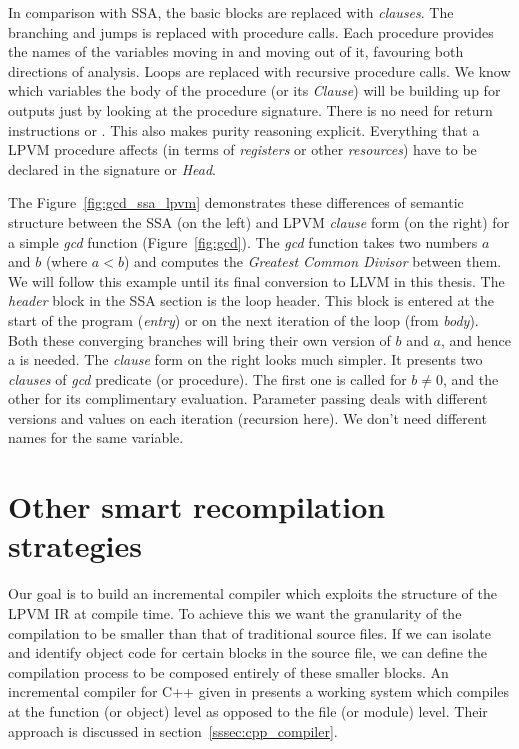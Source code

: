 In comparison with SSA, the basic blocks are replaced with \textit{clauses}.
The branching and jumps is replaced with procedure calls. Each procedure
provides the names of the variables moving in and moving out of it, favouring
both directions of analysis. Loops are replaced with recursive procedure
calls. We know which variables the body of the procedure (or its
\textit{Clause}) will be building up for outputs just by looking at the
procedure signature. There is no need for return instructions or \phifs. This
also makes purity reasoning explicit. Everything that a LPVM procedure affects
(in terms of \textit{registers} or other \textit{resources}) have to be
declared in the signature or \textit{Head}.

The Figure~\ref{fig:gcd_ssa_lpvm} demonstrates these differences of semantic
structure between the SSA (on the left) and LPVM \textit{clause} form (on the
right) for a simple \textit{gcd} function (Figure~\ref{fig:gcd}). The
\textit{gcd} function takes two numbers $a$ and $b$ (where $a < b$) and
computes the \textit{Greatest Common Divisor} between them. We will follow this
example until its final conversion to LLVM in this thesis. The \textit{header}
block in the SSA section is the loop header. This block is entered at the start
of the program (\textit{entry}) or on the next iteration of the loop (from
\textit{body}). Both these converging branches will bring their own version of
$b$ and $a$, and hence a \phif is needed. The \textit{clause} form on the right
looks much simpler. It presents two \textit{clauses} of \textit{gcd} predicate
(or procedure). The first one is called for $b \neq 0$, and the other for its
complimentary evaluation. Parameter passing deals with different versions and
values on each iteration (recursion here). We don't need different names for
the same variable.


\section{Other smart recompilation strategies}
\label{sec:other_compilers}

Our goal is to build an incremental compiler which exploits the structure of
the LPVM IR at compile time. To achieve this we want the granularity of the
compilation to be smaller than that of traditional source files. If we can
isolate and identify object code for certain blocks in the source file, we can
define the compilation process to be composed entirely of these smaller
blocks. An incremental compiler for C++ given in \cite{cpp_compiler} presents a
working system which compiles at the function (or object) level as opposed to
the file (or module) level. Their approach is discussed in
section~\ref{sssec:cpp_compiler}.

